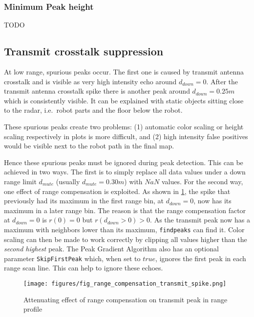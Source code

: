 \subsubsection{Minimum Peak height}\label{minimum-peak-height}
TODO

\subsection{Transmit crosstalk suppression}\label{transmit-crosstalk-suppression}

At low range, spurious peaks occur. The first one is caused by transmit
antenna crosstalk and is visible as very high intensity echo around
\(d_{down}=0\). After the transmit antenna crosstalk spike there is
another peak around \(d_{down}=0.25m\) which is consistently visible. It
can be explained with static objects sitting close to the radar,
i.e.~robot parts and the floor below the robot.

These spurious peaks create two problems: (1) automatic color scaling or
height scaling respectively in plots is more difficult, and (2) high
intensity false positives would be visible next to the robot path in the
final map.

Hence these spurious peaks must be ignored during peak detection. This
can be achieved in two ways. The first is to simply replace all data
values under a down range limit \(d_{mute}\) (usually
\(d_{mute}=0.30m\)) with \(NaN\) values. For the second way, one effect
of range compensation is exploited. As shown in \cref{fig:fig_range_compensation_transmit_spike}, the spike
that previously had its maximum in the first range bin, at
\(d_{down}=0\), now has its maximum in a later range bin. The reason is
that the range compensation factor at \(d_{down}=0\) is \(r(0) = 0\) but
\(r(d_{down}>0) > 0\). As the transmit peak now has a maximum with
neighbors lower than its maximum, \texttt{findpeaks} can find it. Color
scaling can then be made to work correctly by clipping all values higher
than the \emph{second highest} peak. The Peak Gradient Algorithm also
has an optional parameter \texttt{SkipFirstPeak} which, when set to
\(true\), ignores the first peak in each range scan line. This can help
to ignore these echoes.

\begin{figure}[htbp]
    \centering
    \texttt{[image: figures/fig\_range\_compensation\_transmit\_spike.png]}
    \caption{Attenuating effect of range compensation on transmit peak in range profile}
    \label{fig:fig_range_compensation_transmit_spike}
\end{figure}

